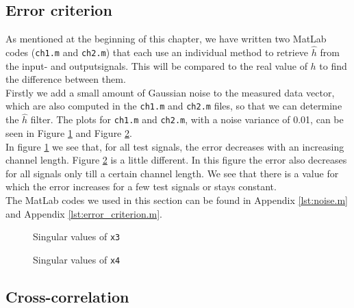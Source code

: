 \documentclass[final]{scrreprt} %
\begin{document}
\subsection{Error criterion}
As mentioned at the beginning of this chapter, we have written two MatLab codes (\texttt{ch1.m} and \texttt{ch2.m}) that each use an individual method to retrieve $\hat{h}$ from the input- and outputsignals.
This will be compared to the real value of $h$ to find the difference between them. \\
Firstly we add a small amount of Gaussian noise to the measured data vector, which are also computed in the \texttt{ch1.m} and \texttt{ch2.m} files, so that we can determine the $\hat{h}$ filter.
The plots for \texttt{ch1.m} and \texttt{ch2.m}, with a noise variance of 0.01, can be seen in Figure \ref{fig:error1} and Figure \ref{fig:error2}.\\
In figure \ref{fig:error1} we see that, for all test signals, the error decreases with an increasing channel length.
Figure \ref{fig:error2} is a little different.
In this figure the error also decreases for all signals only till a certain channel length.
We see that there is a value for which the error increases for a few test signals or stays constant.\\
The MatLab codes we used in this section can be found in Appendix \ref{lst:noise.m} and Appendix \ref{lst:error_criterion.m}.


\begin{figure}[H]
	\centering
    	\setlength\figureheight{6cm}
    	\setlength\figurewidth{10cm}
    	    	
    	\caption{Singular values of \texttt{x3}}
    	\label{fig:error1}
\end{figure}

\begin{figure}[H]
	\centering
    	\setlength\figureheight{6cm}
    	\setlength\figurewidth{10cm}
    	    	
    	\caption{Singular values of \texttt{x4}}
    	\label{fig:error2}
\end{figure}


\subsection{Cross-correlation}
\end{document}
